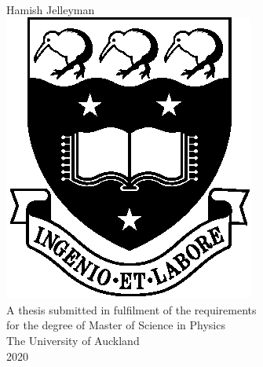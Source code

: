 \documentclass[a4paper,twoside,12pt]{book}
\begin{document}
\frontmatter
\begin{titlepage} \null\vfill \centering
  {\Huge \bf } \\ \vspace{20mm} {\Large Hamish Jelleyman} \\ \vspace{20mm} \includegraphics{Images/UoA_Crest.eps} \\ \vspace{20mm} A thesis submitted in fulfilment of the requirements \\ for the degree of Master of Science in Physics \\ \vspace{20mm} The University of Auckland \\ 2020
\vfill\null \end{titlepage}




\tableofcontents
\listoffigures
\listoftables

\mainmatter








\end{document}
